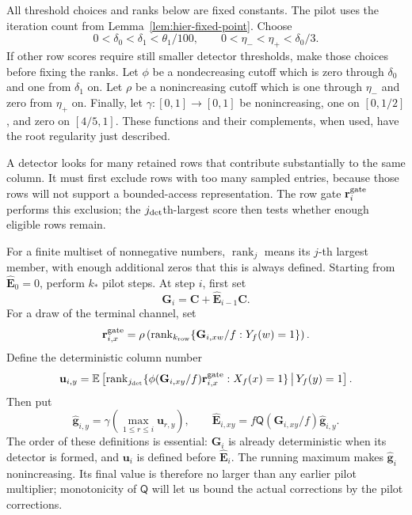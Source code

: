 \documentclass[11pt]{article}
\numberwithin{equation}{section}
\theoremstyle{definition}
\theoremstyle{remark}
\begin{document}
All threshold choices and ranks below are fixed constants.  The pilot
uses the iteration count from Lemma~\ref{lem:hier-fixed-point}.  Choose
\[
 0<\delta_0<\delta_1<\theta_1/100,
 \qquad 0<\eta_-<\eta_+<\delta_0/3.
\]
If other row scores require still smaller detector thresholds, make those
choices before fixing the ranks.  Let $\phi$ be a nondecreasing cutoff
which is zero through $\delta_0$ and one from $\delta_1$ on.  Let $\rho$
be a nonincreasing cutoff which is one through $\eta_-$ and zero from
$\eta_+$ on.  Finally, let $\gamma:[0,1]\to[0,1]$ be nonincreasing,
one on $[0,1/2]$, and zero on $[4/5,1]$.  These functions and their
complements, when used, have the root regularity just described.

A detector looks for many retained rows that contribute substantially to the same column. It must first exclude rows with too many sampled entries, because those rows will not support a bounded-access representation. The row gate ${\mathbf{r}}^{\rm gate}_i$ performs this exclusion; the ${j_{\rm det}}$th-largest score then tests whether enough eligible rows remain.

For a finite multiset of nonnegative numbers, $\operatorname{rank}_j$
means its $j$-th largest member, with enough additional zeros that this is
always defined.  Starting from $\widehat {\mathbf{E}}_0=0$, perform $k_*$ pilot
steps.  At step $i$, first set
\begin{equation}
 {\mathbf{G}}_i={\mathbf{C}}+\widehat {\mathbf{E}}_{i-1}{\mathbf{C}}.
 \label{eq:hier-pilot-input}
\end{equation}
For a draw of the terminal channel, set
\begin{equation}
 {\mathbf{r}}^{\rm gate}_{i,x}=\rho\left(\operatorname{rank}_{k_{\rm row}}
       \{{\mathbf{G}}_{i,xw}/f:Y_f(w)=1\}\right).
 \label{eq:hier-pilot-row-gate}
\end{equation}
Define the deterministic column number
\begin{equation}
 {\mathbf{u}}_{i,y}=\mathbb E\left[
    \operatorname{rank}_{j_{\rm det}}
       \{\phi({\mathbf{G}}_{i,xy}/f){\mathbf{r}}^{\rm gate}_{i,x}:X_f(x)=1\}
       \,\middle|\,Y_f(y)=1\right].
 \label{eq:hier-detector}
\end{equation}
Then put
\begin{equation}
 \widehat {\mathbf{g}}_{i,y}=\gamma\left(\max_{1\leq r\leq i}{\mathbf{u}}_{r,y}\right),
 \qquad
 \widehat {\mathbf{E}}_{i,xy}=f{\mathsf{Q}}({\mathbf{G}}_{i,xy}/f)\widehat {\mathbf{g}}_{i,y}.
 \label{eq:hier-pilot-correction}
\end{equation}
The order of these definitions is essential: ${\mathbf{G}}_i$ is already
deterministic when its detector is formed, and ${\mathbf{u}}_i$ is defined before
$\widehat {\mathbf{E}}_i$.  The running maximum makes $\widehat {\mathbf{g}}_i$ nonincreasing.
Its final value is therefore no larger than any earlier pilot multiplier;
monotonicity of ${\mathsf{Q}}$ will let us bound the actual corrections by the pilot
corrections.
\end{document}
